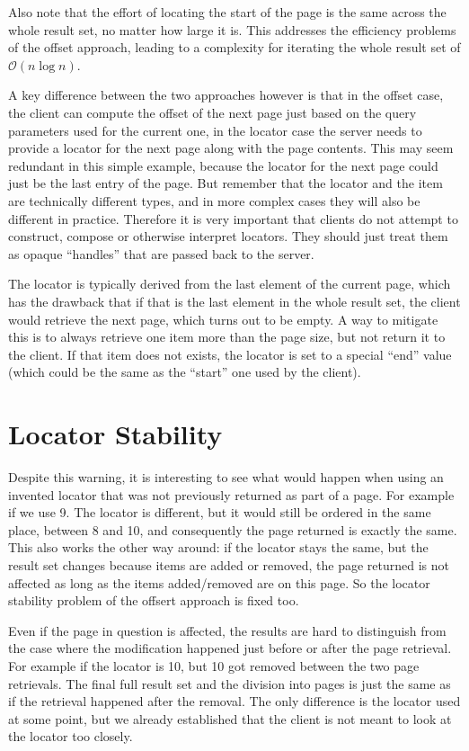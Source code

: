 \documentclass[11pt,a4paper]{article}
\begin{document}
\begin{multicols}{2}
Also note that the effort of locating the start of the page is the same across
the whole result set, no matter how large it is. This addresses the efficiency
problems of the offset approach, leading to a complexity for iterating the whole
result set of $\mathcal{O}(n\log{}n)$.

A key difference between the two approaches however is that in the offset case,
the client can compute the offset of the next page just based on the query
parameters used for the current one, in the locator case the server needs to
provide a locator for the next page along with the page contents. This may seem
redundant in this simple example, because the locator for the next page could
just be the last entry of the page. But remember that the locator and the item 
are technically different types, and in more complex cases they will also be
different in practice. Therefore it is very important that clients do not
attempt to construct, compose or otherwise interpret locators. They should just
treat them as opaque ``handles'' that are passed back to the server.

The locator is typically derived from the last element of the current page,
which has the drawback that if that is the last element in the whole result set,
the client would retrieve the next page, which turns out to be empty. A way to
mitigate this is to always retrieve one item more than the page size, but not
return it to the client. If that item does not exists, the locator is set to a
special ``end'' value (which could be the same as the ``start'' one used by the
client). 

\section*{Locator Stability}

Despite this warning, it is interesting to see what would happen when using an
invented locator that was not previously returned as part of a page. For example 
if we use 9. The locator is different, but it would still be ordered in the same
place, between 8 and 10, and consequently the page returned is exactly the same.
This also works the other way around: if the locator stays the same, but the
result set changes because items are added or removed, the page returned is not
affected as long as the items added/removed are on this page. So the locator
stability problem of the offsert approach is fixed too.

Even if the page in question is affected, the results are hard to distinguish
from the case where the modification happened just before or after the page
retrieval. For example if the locator is 10, but 10 got removed between the two
page retrievals. The final full result set and the division into pages is just
the same as if the retrieval happened after the removal. The only difference is
the locator used at some point, but we already established that the client is
not meant to look at the locator too closely.


\end{multicols}
\end{document}
